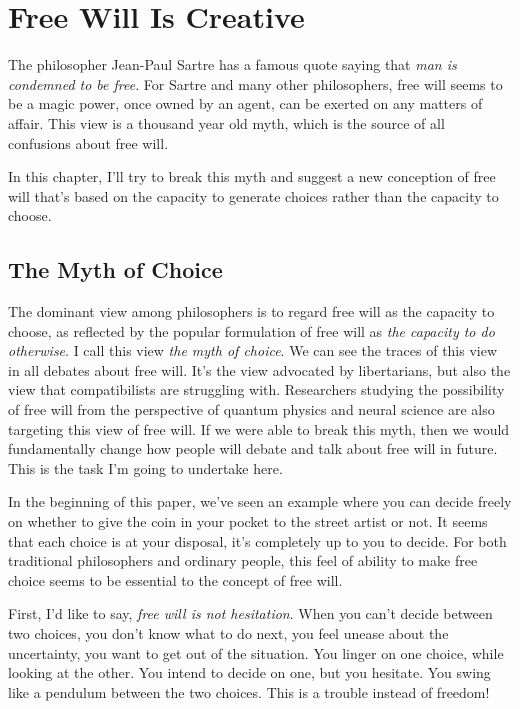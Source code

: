 \section{Free Will Is Creative}

The philosopher Jean-Paul Sartre has a famous quote saying that \emph{man is condemned to be free}. For Sartre and many other philosophers, free will seems to be a magic power, once owned by an agent, can be exerted on any matters of affair. This view is a thousand year old myth, which is the source of all confusions about free will.

In this chapter, I'll try to break this myth and suggest a new conception of free will that's based on the capacity to generate choices rather than the capacity to choose.


\subsection{The Myth of Choice}

The dominant view among philosophers is to regard free will as the capacity to choose, as reflected by the popular formulation of free will as \emph{the capacity to do otherwise}. I call this view \emph{the myth of choice}. We can see the traces of this view in all debates about free will. It's the view advocated by libertarians, but also the view that compatibilists are struggling with. Researchers studying the possibility of free will from the perspective of quantum physics and neural science are also targeting this view of free will. If we were able to break this myth, then we would fundamentally change how people will debate and talk about free will in future. This is the task I'm going to undertake here.

In the beginning of this paper, we've seen an example where you can decide freely on whether to give the coin in your pocket to the street artist or not. It seems that each choice is at your disposal, it's completely up to you to decide. For both traditional philosophers and ordinary people, this feel of ability to make free choice seems to be essential to the concept of free will.

First, I'd like to say, \emph{free will is not hesitation}. When you can't decide between two choices, you don't know what to do next, you feel unease about the uncertainty, you want to get out of the situation. You linger on one choice, while looking at the other. You intend to decide on one, but you hesitate. You swing like a pendulum between the two choices. This is a trouble instead of freedom!

